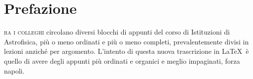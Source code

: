 \chapter{Prefazione}
\noindent{}\textsc{ra i colleghi} circolano diversi blocchi di appunti del corso di Istituzioni di Astrofisica, più o meno ordinati e più o meno completi, prevalentemente divisi in lezioni anziché per argomento. L'intento di questa nuova trascrizione in \LaTeX\ è quello di avere degli appunti più ordinati e organici e meglio impaginati, forza napoli.